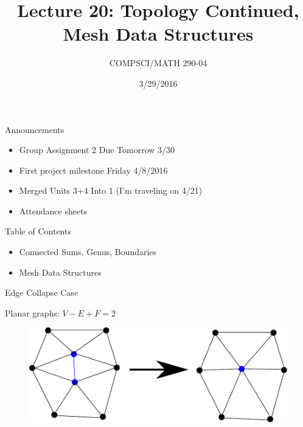 \documentclass{beamer}
\title{Lecture 20: Topology Continued, Mesh Data Structures}
\date{3/29/2016}
\institute{Chris Tralie, Duke University}
\author{COMPSCI/MATH 290-04}
\begin{document}
\frame{\titlepage}

\begin{frame}{Announcements}
\begin{itemize}[label=$\vartriangleright$]

\item Group Assignment 2 Due Tomorrow 3/30

\item First project milestone Friday 4/8/2016

\item Merged Units 3+4 Into 1 (I'm traveling on 4/21)

\item Attendance sheets

\end{itemize}

\end{frame}

\begin{frame}{Table of Contents}
\begin{itemize}[label=$\blacktriangleright$]
	\item Connected Sums, Genus, Boundaries
\end{itemize}

\begin{itemize}[label=$\vartriangleright$]
	\item Mesh Data Structures
\end{itemize}
\end{frame}

\begin{frame}{Edge Collapse Case}

Planar graphs: $V - E + F = 2$

\begin{figure}[t]
    \includegraphics[width=\textwidth]{EdgeCollapse.pdf}
\end{figure}

\end{frame}
\end{document}
